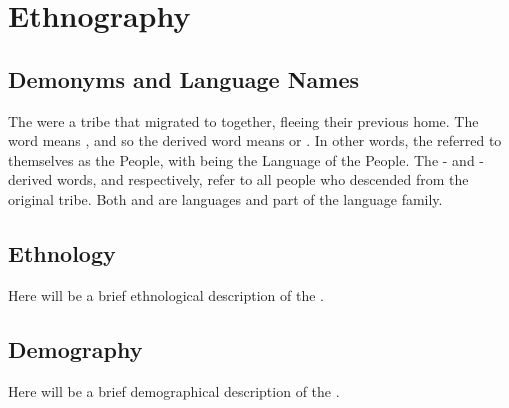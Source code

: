 \section{Ethnography}
\label{sec:tvk-ethnography}

\subsection{Demonyms and Language Names}
\label{subsec:tvk-demonyms}

The \peoptvk{} were a tribe that migrated to \landn{} together, fleeing their previous home. The \langtvk{} word   means , and so the derived word \fw{\npeoptvk}  means  or . In other words, the \peoptvk{} referred to themselves as the People, with \fw{\nlangtvk} being the Language of the People. The \langank- and \langrdk-derived words,   and   respectively, refer to all people who descended from the original \peoptvk{} tribe. Both \langank{} and \langrdk{} are \peoptvk{} languages and part of the \langtvk{} language family.

\subsection{Ethnology}
\label{subsec:tvk-ethnology}

Here will be a brief ethnological description of the \peoptvk.

\subsection{Demography}
\label{subsec:tvk-demography}

Here will be a brief demographical description of the \peoptvk.